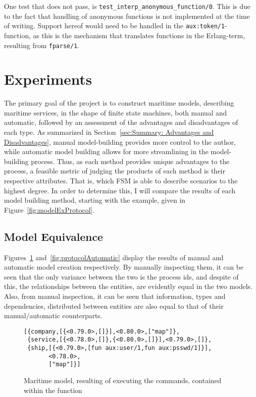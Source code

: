 One test that does not pass, is \lstinline{test_interp_anonymous_function/0}. This is due to the fact that handling of anonymous functions is not implemented at the time of writing. Support hereof would need to be handled in the \linebreak \lstinline{aux:token/1}-function, as this is the mechanism that translates functions in the Erlang-term, resulting from \lstinline{fparse/1}.

\section{Experiments}

The primary goal of the project is to construct maritime models, describing maritime services, in the shape of finite state machines, both manual and automatic, followed by an assessment of the advantages and disadvantages of each type. As summarized in Section~\ref{sec:Summary: Advantages and Disadvantages}, manual model-building provides more control to the author, while automatic model building allows for more streamlining in the model-building process. Thus, as each method provides unique advantages to the process, a feasible metric of judging the products of each method is their respective attributes. That is, which FSM is able to describe scenarios to the highest degree. In order to determine this, I will compare the results of each model building method, starting with the example, given in Figure~\ref{fig:modelExProtocol}.

\subsection{Model Equivalence}

Figures~\ref{fig:protocolManual} and~\ref{fig:protocolAutomatic} display the results of manual and automatic model creation respectively. By manually inspecting them, it can be seen that the only variance between the two is the process ids, and despite of this, the relationships between the entities, are evidently equal in the two models. Also, from manual inspection, it can be seen that information, types and dependencies, distributed between entities are also equal to that of their manual/automatic counterparts.

\begin{figure}[h]
  \begin{lstlisting}[keywordstyle={}]
[{company,[{<0.79.0>,[]}],<0.80.0>,["map"]},
 {service,[{<0.78.0>,[]},{<0.80.0>,[]}],<0.79.0>,[]},
 {ship,[{<0.79.0>,[fun aux:user/1,fun aux:psswd/1]}],
       <0.78.0>,
       ["map"]}]
  \end{lstlisting}
  \caption{Maritime model, resulting of executing the commands, contained within the function }
  \label{fig:protocolManual}
\end{figure}

